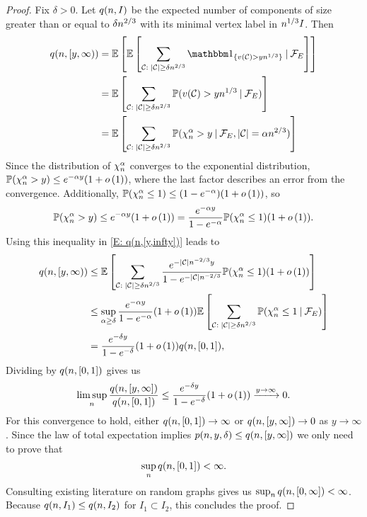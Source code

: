 \begin{proof}
	Fix $\delta > 0$.
	Let $q(n,I)$ be the expected number of components of size greater than or equal to $\delta n^{2 / 3}$ 
	with its minimal vertex label in $n^{1 / 3}I$.
	Then
	\begin{equation} \label{E: q(n,[y,infty])}
	\begin{aligned}
	\NComp{[y, \infty)}
	&= \ExpBig{ \ExpBig{ \sum_{\Ccal: \; |\Ccal| \geq \delta\n{2}{3}} \Ind{\{ v(\Ccal) > y\n{1}{3} \}} \cond \SigmaAlgebra_E } } \\
	&= \ExpBig{ \sum_{\Ccal: \; |\Ccal| \geq \delta\n{2}{3}} \Prob( v(\Ccal) > y\n{1}{3} \cond \SigmaAlgebra_E) } \\
	&= \ExpBig{ \sum_{\Ccal: \; |\Ccal| \geq \delta\n{2}{3}} \Prob(\ChiAn > y \cond \SigmaAlgebra_E, |\Ccal| = \alpha\n{2}{3}) }
	\end{aligned}
	\end{equation}
	Since the distribution of $\chi^\alpha_n$ converges to the exponential distribution,
	$\mathbb{P}(\chi^\alpha_n > y) \leq e^{-\alpha y} (1+ o\left(1\right))$,
	where the last factor describes an error from the convergence.
	Additionally, $\mathbb{P}(\chi^\alpha_n \leq 1) \leq (1 - e^{-\alpha}) (1+ o\left(1\right))$,
	so
	\begin{equation}
	\mathbb{P}(\chi^\alpha_n > y) \leq e^{-\alpha y} (1+ o\left(1\right)) = \frac{e^{-\alpha y}}{1 - e^{-\alpha}} \mathbb{P}(\chi^\alpha_n \leq 1) (1 + o\left(1\right)).
	\end{equation}
	Using this inequality in \eqref{E: q(n,[y,infty])} leads to
	\begin{equation}
	\begin{aligned}
	q(n,[y, \infty))
	&\leq \mathbb{E} \left[  \sum_{\mathcal{C}: \; |\mathcal{C}| \geq \delta n^{2 / 3}}
		\frac{e^{-|\mathcal{C}|n^{-2 / 3}y}}{1-e^{-|\mathcal{C}|n^{-2 / 3}}} \mathbb{P}(\chi^\alpha_n \leq 1) (1 + o\left(1\right))  \right] \\
	&\leq \sup_{\alpha \geq \delta} \frac{e^{-\alpha y}}{1-e^{-\alpha}} (1 + o\left(1\right)) 
		\mathbb{E} \left[  \sum_{\mathcal{C}: \; |\mathcal{C}| \geq \delta n^{2 / 3}} \mathbb{P}(\chi^\alpha_n \leq 1 \: | \: \mathcal{F}_E )  \right] \\
	&= \frac{e^{-\delta y}}{1-e^{-\delta}} (1 + o\left(1\right)) q(n,[0,1]),
	\end{aligned}
	\end{equation}
	Dividing by $q(n,[0,1])$ gives us
	\begin{equation}
	\limsup_n \frac{q(n,[y,\infty])}{q(n,[0,1])} \leq \frac{e^{-\delta y}}{1-e^{-\delta}} (1 + o\left(1\right)) \xrightarrow{y \rightarrow \infty} 0.
	\end{equation}
	For this convergence to hold,
	either $q(n,[0,1]) \rightarrow \infty$ or $q(n,[y,\infty]) \rightarrow 0$ as $y \rightarrow \infty$.
	Since the law of total expectation implies $p(n,y,\delta) \leq q(n,[y,\infty])$
	we only need to prove that
	\begin{equation}
	\sup_n q(n,[0,1]) < \infty.
	\end{equation}
	Consulting existing literature on random graphs gives us $\sup_n q(n,[0, \infty]) < \infty$.
	Because $q(n,I_1) \leq q(n,I_2)$ for $I_1 \subset I_2$,
	this concludes the proof.
	
\end{proof}
